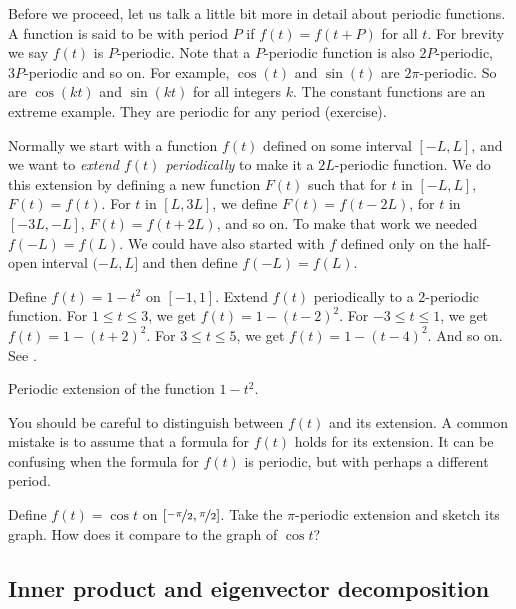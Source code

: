 Before we proceed, let us talk a little bit more in detail about
periodic functions.
A function is said to be \emph{} with period $P$ if
$f(t) = f(t+P)$ for all $t$.  For brevity we say $f(t)$ is $P$-periodic.
Note that a $P$-periodic function is also $2P$-periodic, $3P$-periodic
and so on.
For example, $\cos (t)$ and $\sin (t)$ are
$2\pi$-periodic.  So are $\cos (kt)$ and $\sin (kt)$ for all integers $k$.  The
constant functions are an extreme example.  They are periodic for any period
(exercise).

Normally we start with a function $f(t)$ defined on some interval $[-L,L]$,
and we want to
\emph{extend $f(t)$ periodically}
to make it
a $2L$-periodic function.  We do this extension
by defining a new function $F(t)$
such that for $t$ in $[-L,L]$, $F(t) = f(t)$.  For $t$ in $[L,3L]$,
we define $F(t) = f(t-2L)$, for $t$ in $[-3L,-L]$, $F(t) = f(t+2L)$, and
so on.
To make that work we needed $f(-L) = f(L)$.
We could have also started with $f$
defined only on the half-open interval $(-L,L]$ and then define $f(-L) = f(L)$.

\begin{example}
Define $f(t) = 1-t^2$ on $[-1,1]$.  Extend $f(t)$ periodically to
a 2-periodic function.
For $1 \leq t \leq 3$, we get
$f(t) = 1-{(t-2)}^2$.
For $-3 \leq t \leq 1$, we get
$f(t) = 1-{(t+2)}^2$.
For $3 \leq t \leq 5$, we get
$f(t) = 1-{(t-4)}^2$.  And so on.
See .
\begin{myfig}
\capstart
{}
\caption{Periodic extension of the function
$1-t^2$.\label{ts:perextofinvertedparabolafig}}
\end{myfig}
\end{example}

You should be careful to distinguish between $f(t)$ and its extension.  A common
mistake is to assume that a formula for $f(t)$ holds for its extension.  It
can be confusing when the formula for $f(t)$ is periodic, but with perhaps
a different period.

\begin{exercise}
Define $f(t) = \cos t$ on $[\nicefrac{-\pi}{2},\nicefrac{\pi}{2}]$.  Take the $\pi$-periodic
extension and sketch its graph.  How does it compare to the graph of
$\cos t$?
\end{exercise}

\subsection{Inner product and eigenvector decomposition}

